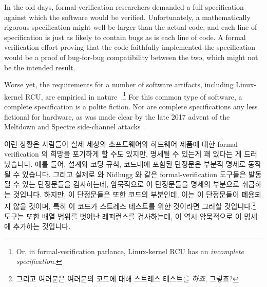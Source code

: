 In the old days, formal-verification researchers demanded a full
specification against which the software would be verified.
Unfortunately, a mathematically rigorous specification might well
be larger than the actual code, and each line of specification
is just as likely to contain bugs as is each line of code.
A formal verification effort proving that the code faithfully
implemented the specification would be a proof of bug-for-bug
compatibility between the two, which might not be the intended
result.

Worse yet, the requirements for a number of software artifacts,
including Linux-kernel RCU, are empirical in
nature~\cite{PaulEMcKenney2015RCUreqts1,PaulEMcKenney2015RCUreqts2,PaulEMcKenney2015RCUreqts3}.\footnote{
	Or, in formal-verification parlance, Linux-kernel RCU has an
	\emph{incomplete specification}.}
For this common type of software, a complete specification is a
polite fiction.
Nor are complete specifications any less fictional for hardware,
as was made clear by the late 2017 advent of the Meltdown and Spectre
side-channel attacks~\cite{JannHorn2018MeltdownSpectre}.
\fi

이런 상황은 사람들이 실제 세상의 소프트웨어와 하드웨어 제품에 대한 formal
verification 의 희망을 포기하게 할 수도 있지만, 명세될 수 있는게 꽤 있다는 게
드러났습니다.
예를 들어, 설계와 코딩 규칙, 코드내에 포함된 단정문은 부분적 명세로 동작될 수
있습니다.
그리고 실제로  와 Nidhugg 와 같은 formal-verification 도구들은 발동될
수 있는 단정문들을 검사하는데, 암묵적으로 이 단정문들을 명세의 부분으로
취급하는 것입니다.
하지만, 이 단정문들은 또한 코드의 부분인데, 이는 이 단정문들이 폐용되지 않을
것이며, 특히 이 코드가 스트레스 테스트를 위한 것이라면 그러할
것입니다.\footnote{
	그리고 여러분은 여러분의 코드에 대해 스트레스 테스트를 \emph{하죠},
	그렇죠?}
 도구는 또한 배열 범위를 벗어난 레퍼런스를 검사하는데, 이 역시
암묵적으로 이 명세에 추가하는 것입니다.
\iffalse

This situation might cause one to give up all hope of formal verification
of real-world software and hardware artifacts, but it turns out that there is
quite a bit that can be done.
For example, design and coding rules can act as a partial specification,
as can assertions contained in the code.
And in fact formal-verification tools such as \co{cbmc} and Nidhugg
both check for assertions that can be triggered, implicitly treating
these assertions as part of the specification.
However, the assertions are also part of the code, which makes it less
likely that they will become obsolete, especially if the code is
also subjected to stress tests.\footnote{
	And you \emph{do} stress-test your code, don't you?}
The \co{cbmc} tool also checks for array-out-of-bound references,
thus implicitly adding them to the specification.
\fi

